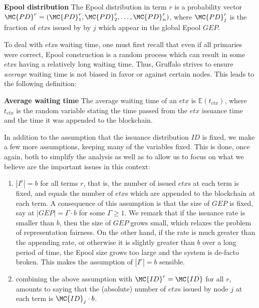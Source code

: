 \begin{definition} {\textbf{Epool distribution}}
The Epool distribution in term $r$ is a probability vector $\MC{PD}^r=(\MC{PD}_1^r,\MC{PD}_2^r,\dots,\MC{PD}_n^r)$, where $\MC{PD}_j^r$ is the fraction of $etx$s issued by by $j$ which appear in the global Epool $GEP$.
\end{definition}

To deal with $etx$s waiting time, one must first recall that even if all primaries were correct, Epool construction is a random process which can result in some $etx$s having a relatively long waiting time. Thus, Gruffalo strives to ensure \emph{average} waiting time is not biased in favor or against certain nodes. 
This leads to the following definition:
\begin{definition}{\textbf{Average waiting time}}
The average waiting time of an $etx$ is $\mathbb{E}(t_{etx})$, where $t_{etx}$ is the random variable stating the time passed from the $etx$ issuance time and the time it was appended to the blockchain.
\end{definition}


In addition to the assumption that the issuance distribution $ID$ is fixed, we make a few more assumptions, keeping many of the variables fixed. This is done, once again, both to simplify the analysis as well as to allow us to focus on what we believe are the important issues in this context:
\begin{enumerate}
\item $|I^r|=b$ for all terms $r$, that is, the number of issued $etx$s at each term is fixed, and equals the number of $etx$s which are appended to the blockchain at each term. A consequence of this assumption is that the size of $GEP$ is fixed, say at $|GEP|=\Gamma\cdot b$ for some $\Gamma\geq 1$. We remark that if the issuance rate is smaller than $b$, then the size of $GEP$ grows small, which relaxes the problem of representation fairness. On the other hand, if the rate is much greater than the appending rate, or otherwise it is slightly greater than $b$ over a long period of time, the Epool size grows too large and the system is de-facto broken. This makes the assumption of $|I^r|=b$ sensible. 

\item combining the above assumption with $\MC{ID}^r=\MC{ID}$ for all $r$, amounts to saying that the (absolute) number of $etx$s issued by node $j$ at each term is $\MC{ID}_j\cdot b$.
\end{enumerate}

